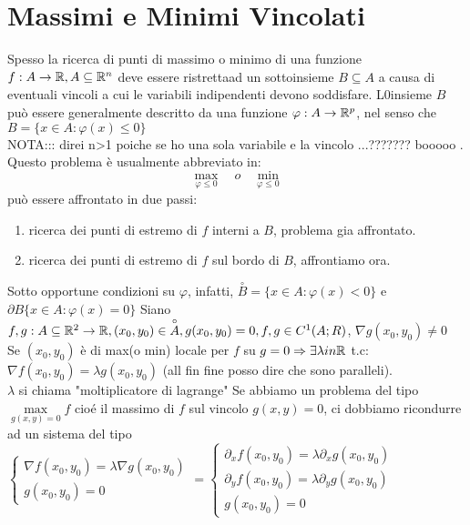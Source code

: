 \section{Massimi e Minimi Vincolati}
Spesso la ricerca di punti di massimo o minimo di una funzione $f:A\rightarrow \mathbb{R}, A\subseteq \mathbb{R}^n$ deve essere ristrettaad un sottoinsieme $B\subseteq A$ a causa di eventuali vincoli a cui le variabili indipendenti devono soddisfare. L0insieme $B$ può essere generalmente descritto da una funzione $\varphi :A\rightarrow \mathbb{R}^p$, nel senso che $B=\{x\in A:\varphi (x)\le 0\}$\\
NOTA::: direi n>1 poiche se ho una sola variabile e la vincolo ...??????? booooo .\\
Questo problema è usualmente abbreviato in:
$$\max\limits_{\varphi \le 0}\quad o \quad\min\limits_{\varphi \le 0}$$
può essere affrontato in due passi:\\
\begin{enumerate}
	\item ricerca dei punti di estremo di $f$ interni a $B$, problema gia affrontato.
	\item ricerca dei punti di estremo di $f$ sul bordo di $B$, affrontiamo ora.
\end{enumerate}
Sotto opportune condizioni su $\varphi$, infatti, $\overset{\circ}{B} = \{x\in A:\varphi(x)<0\}$ e $\partial B\{x\in A:\varphi(x)=0\}$
Siano $f,g:A\subseteq \mathbb{R}^2\rightarrow \mathbb{R}, (x_0,y_0)\in\overset{\circ}{A}, g(x_0,y_0)=0, f,g\in C^1(A;R)$, $\nabla g (x_0,y_0)\ne 0$\\
Se $(x_0,y_0)$ è di max(o min) locale per $f$ su $g=0\Rightarrow\exists \lambda in \mathbb{R}$ t.c: $\nabla f(x_0,y_0) = \lambda g(x_0,y_0)$ (all fin fine posso dire che sono paralleli).\\
\observation
$\lambda$ si chiama "moltiplicatore di lagrange"
\observation
Se abbiamo un problema del tipo $\max\limits_{g(x,y)=0}f$ cio\'e il massimo di $f$ sul vincolo $g(x,y)=0$, ci dobbiamo ricondurre ad un sistema del tipo
$\begin{cases} \nabla f(x_0,y_0)=\lambda \nabla g(x_0,y_0)\\ g(x_0,y_0)=0 \end{cases}=\begin{cases} \partial_xf(x_0,y_0)=\lambda \partial_xg(x_0,y_0)\\\partial_yf(x_0,y_0)=\lambda \partial_yg(x_0,y_0)\\ g(x_0,y_0)=0 \end{cases}$\\
